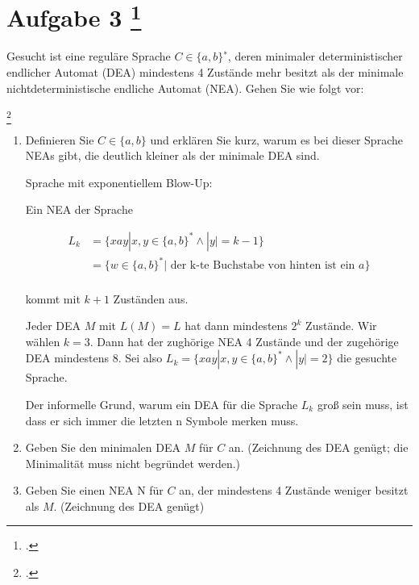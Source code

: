 \documentclass{lehramt-informatik-aufgabe}
\begin{document}
\section{Aufgabe 3
\footcite{66115:2018:03}}

Gesucht ist eine reguläre Sprache $C \in \{a, b\}^∗$, deren minimaler
deterministischer endlicher Automat (DEA) mindestens 4 Zustände mehr
besitzt als der minimale nichtdeterministische endliche Automat (NEA).
Gehen Sie wie folgt vor:

\footcite{theo:ab:1}

\begin{enumerate}


\item Definieren Sie $C \in \{a, b\}$ und erklären Sie kurz, warum es
bei dieser Sprache NEAs gibt, die deutlich kleiner als der minimale DEA
sind.

\begin{liAntwort}
Sprache mit exponentiellem Blow-Up:

Ein NEA der Sprache

\begin{align*}
L_k &= \{ xay | x, y \in \{a, b\}^* \land |y| = k − 1 \}\\
    &= \{ w \in \{a, b\}^* | \text{ der k-te Buchstabe von hinten ist ein } a\}\\
\end{align*}

kommt mit $k + 1$ Zuständen aus.

Jeder DEA $M$ mit $L(M) = L$ hat dann mindestens $2^k$ Zustände. Wir
wählen $k = 3$. Dann hat der zughörige NEA 4 Zustände und der zugehörige
DEA mindestens $8$. Sei also $L_k = \{ xay | x, y \in \{a, b\}^* \land
|y| = 2 \}$ die gesuchte Sprache.

Der informelle Grund, warum ein DEA für die Sprache $L_k$ groß sein muss, ist
dass er sich immer die letzten n Symbole merken muss.
\end{liAntwort}


\item Geben Sie den minimalen DEA $M$ für $C$ an.
(Zeichnung des DEA genügt; die Minimalität muss nicht begründet werden.)


\item Geben Sie einen NEA N für $C$ an, der mindestens 4 Zustände
weniger besitzt als $M$. (Zeichnung des DEA genügt)


\end{enumerate}
\end{document}

